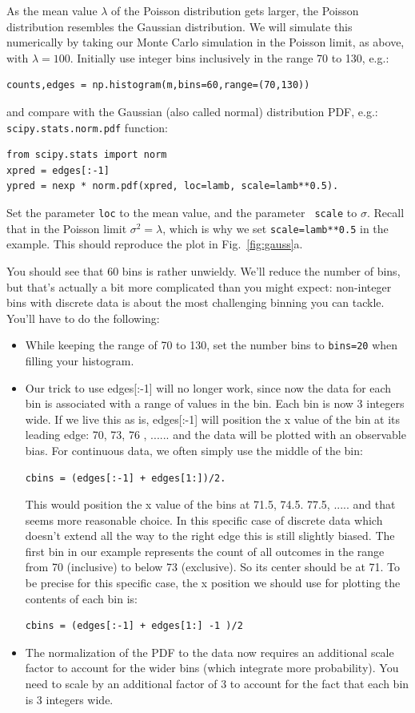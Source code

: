 As the mean value $\lambda$ of the Poisson distribution gets larger,
the Poisson distribution resembles the Gaussian distribution.  We will
simulate this numerically by taking our Monte Carlo simulation in the
Poisson limit, as above, with $\lambda = 100$.  Initially use
integer bins inclusively in the range 70 to 130, e.g.:
\begin{verbatim}
counts,edges = np.histogram(m,bins=60,range=(70,130))
\end{verbatim}
and compare with the Gaussian (also called normal) distribution PDF, e.g.:
{\tt scipy.stats.norm.pdf} function:
\begin{verbatim}
from scipy.stats import norm
xpred = edges[:-1]
ypred = nexp * norm.pdf(xpred, loc=lamb, scale=lamb**0.5). 
\end{verbatim}

\begin{plot} Set the parameter {\tt loc} to the mean value, and the parameter {\tt
  scale} to $\sigma$.  Recall that in the Poisson limit $\sigma^2 =
\lambda$, which is why we set {\tt scale=lamb**0.5} in the example.
This should reproduce the plot in Fig.~\ref{fig:gauss}a. \end{plot}

You should see that 60 bins is rather unwieldy.  We'll reduce the number
of bins, but that's actually a bit more complicated than you might
expect: non-integer bins with discrete data is about the most
challenging binning you can tackle.  You'll have to do the following:
\begin{itemize}
\item While keeping the range of 70 to 130, set the number bins to {\tt bins=20} when filling your histogram.
\item Our trick to use edges[:-1] will no longer work, since now the data for each bin is associated with a range of values in the bin.  Each bin is now 3 integers wide. If we live this as is, edges[:-1] will position the x value of the bin at its leading edge: 70, 73, 76 , ......  and the data will be plotted with an observable bias.  For continuous data, we often simply use the middle of the bin:
\begin{verbatim}
cbins = (edges[:-1] + edges[1:])/2.  
\end{verbatim}
This would position the x value of the bins at 71.5, 74.5. 77.5, ..... and that seems more reasonable choice. 
In this specific case of discrete data which doesn't extend  all the way to the right edge this is still slightly biased. The first bin in our example represents the count of all outcomes in the range from 70 (inclusive) to below 73 (exclusive). So its center should be at 71.  To be precise for this specific case, the x position we should use for plotting the contents of each bin is:
\begin{verbatim}
cbins = (edges[:-1] + edges[1:] -1 )/2 
\end{verbatim}
\item The normalization of the PDF to the data now requires an additional scale factor to account for the wider bins (which integrate more probability).  You need to scale by an additional factor of 3 to account for the fact that each bin is 3 integers wide.
\end{itemize}

